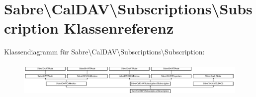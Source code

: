 \hypertarget{class_sabre_1_1_cal_d_a_v_1_1_subscriptions_1_1_subscription}{}\section{Sabre\textbackslash{}Cal\+D\+AV\textbackslash{}Subscriptions\textbackslash{}Subscription Klassenreferenz}
\label{class_sabre_1_1_cal_d_a_v_1_1_subscriptions_1_1_subscription}
Klassendiagramm für Sabre\textbackslash{}Cal\+D\+AV\textbackslash{}Subscriptions\textbackslash{}Subscription\+:\begin{figure}[H]
\begin{center}
\leavevmode
\includegraphics[height=1.716475cm]{class_sabre_1_1_cal_d_a_v_1_1_subscriptions_1_1_subscription}
\end{center}
\end{figure}
